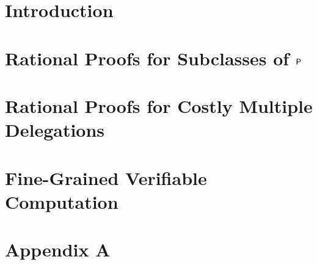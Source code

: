 \documentclass[letterpaper, 12pt, oneside]{book}
\begin{document}
\frontmatter


\setcounter{page}{2}






\tableofcontents
\listoftables
\listoffigures

\mainmatter

\chapter{Introduction}

\clearpage


\chapter{Rational Proofs for Subclasses of $\P$}
\label{chap:RP-expr}

\clearpage


\chapter{Rational Proofs for Costly Multiple Delegations}
\label{chap:RP-seq}

\clearpage



\chapter{Fine-Grained Verifiable Computation}
\label{chap:FG}

\clearpage


\appendix
\chapter{Appendix A}
\label{app:fg-rational}

\clearpage
\end{document}
